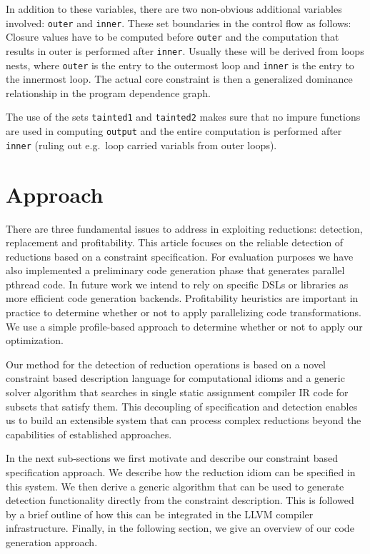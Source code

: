     In addition to these variables, there are two non-obvious additional
    variables involved: \texttt{outer} and \texttt{inner}.
    These set boundaries in the control flow as follows: Closure values have to
    be computed before \texttt{outer} and the computation that results in outer
    is performed after \texttt{inner}.
    Usually these will be derived from loops nests, where \texttt{outer} is the
    entry to the outermost loop and \texttt{inner} is the entry to the innermost
    loop.
    The actual core constraint is then a generalized dominance relationship in
    the program dependence graph.

    The use of the sets \texttt{tainted1} and \texttt{tainted2} makes sure that
    no impure functions are used in computing \texttt{output} and the entire
    computation is performed after \texttt{inner} (ruling out e.g.\ loop carried
    variabls from outer loops).


\newpage

\section{Approach}

There are three fundamental issues to address in exploiting
reductions: detection, replacement and profitability.  This article
focuses on the reliable detection of reductions based on a constraint
specification.  For evaluation purposes we have also implemented a
preliminary code generation phase that generates parallel pthread
code.  In future work we intend to rely on specific DSLs or libraries
as more efficient code generation backends.  Profitability heuristics
are important in practice to determine whether or not to apply
parallelizing code transformations.  We use a simple profile-based
approach to determine whether or not to apply our optimization.

Our method for the detection of reduction operations is based on a novel constraint based description language for computational idioms and a generic solver algorithm that searches in single static assignment compiler IR code for subsets that satisfy them.
This decoupling of specification and detection enables us to build an extensible system that can process complex reductions beyond the capabilities of established approaches.

In the next sub-sections we first motivate and describe our constraint based specification approach.
We describe how the reduction idiom can be specified in this system.
We then derive a generic algorithm that can be used to generate detection functionality directly from the constraint description.
This is followed by a brief outline of how this can be integrated in the LLVM compiler infrastructure.
Finally, in the following section,  we give an overview of our code generation   approach.

